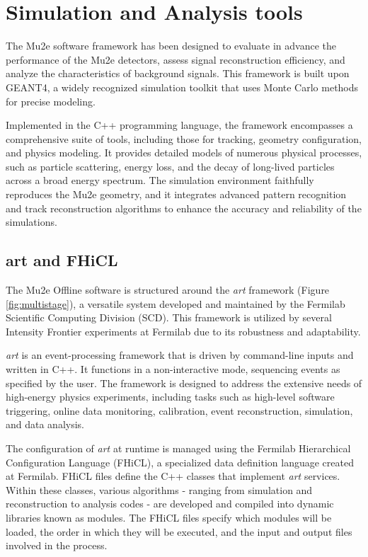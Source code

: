
\chapter{Simulation and Analysis tools}\label{mu2eana}

The Mu2e software framework has been designed to 
evaluate in advance the performance of the 
Mu2e detectors, assess signal reconstruction 
efficiency, and analyze the characteristics of 
background signals. This framework is built upon 
GEANT4, a widely recognized simulation toolkit 
that uses Monte Carlo methods for precise modeling.

Implemented in the C++ programming language, 
the framework encompasses a comprehensive suite of 
tools, including those for tracking, geometry 
configuration, and physics modeling. It provides 
detailed models of numerous physical processes, 
such as particle scattering, energy loss, and the 
decay of long-lived particles across a broad energy 
spectrum. The simulation environment faithfully 
reproduces the Mu2e geometry, and it integrates 
advanced pattern recognition and track reconstruction 
algorithms to enhance the accuracy and reliability of 
the simulations.

\section{art and FHiCL}

The Mu2e Offline software is structured around the \textit{art} framework 
(Figure \ref{fig:multistage}), a versatile system developed and maintained 
by the Fermilab Scientific Computing Division (SCD). This framework is 
utilized by several Intensity Frontier experiments at Fermilab due to its robustness and adaptability.

\textit{art} is an event-processing framework that is driven by command-line 
inputs and written in C++. It functions in a non-interactive mode, sequencing 
events as specified by the user. The framework is designed to address the 
extensive needs of high-energy physics experiments, including tasks such as 
high-level software triggering, online data monitoring, calibration, event 
reconstruction, simulation, and data analysis.

The configuration of \textit{art} at runtime is managed using the Fermilab 
Hierarchical Configuration Language (FHiCL), a specialized data definition 
language created at Fermilab. FHiCL files define the C++ classes that 
implement \textit{art} services. Within these classes, various algorithms -
ranging from simulation and reconstruction to analysis codes - are developed 
and compiled into dynamic libraries known as modules. The FHiCL files specify 
which modules will be loaded, the order in which they will be executed, and 
the input and output files involved in the process.

